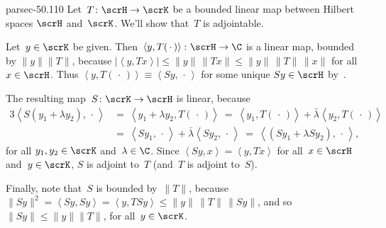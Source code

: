 \documentclass[b5page]{book}
\begin{document}
\begin{solution}{parsec-50.110}%
Let~$T\colon \scrH\to\scrK$
be a bounded linear map between Hilbert spaces
$\scrH$ and~$\scrK$.
We'll show that~$T$ is adjointable.

Let~$y \in \scrK$ be given. 
    Then~$\left<y,T(\,\cdot\,)\right>\colon \scrH\to\C$
    is a linear map,
    bounded by $\|y\|\|T\|$,
    because $\left|\left<y,Tx\right>\right|\leq
    \|y\|\, \|Tx\|\leq \|y\|\,\|T\|\,\|x\|$
    for all~$x\in \scrH$.
Thus $\left<y,T(\,\cdot\,)\right>\equiv \left<Sy,\,\cdot\,\right>$
    for some unique $Sy\in \scrH$ by~.

The resulting map~$S\colon \scrK\to\scrH$
is linear, because
    \begin{alignat*}{3}
\left<S(y_1+\lambda y_2),\,\cdot\,\right>
        &=\  \left< y_1+\lambda y_2, T(\,\cdot\,)\right>
    \ =\  \left<y_1,T(\,\cdot\,)\right> + 
    \bar\lambda\left<y_2,T(\,\cdot\,)\right>\\
        \ &=\  \left<Sy_1,\,\cdot\,\right> + 
    \bar\lambda\left<Sy_2,\,\cdot\,\right>
    \ =\  \left<(Sy_1+\lambda Sy_2),\,\cdot\,\right>,
\end{alignat*}
for all $y_1,y_2\in\scrK$ and~$\lambda\in\C$.
Since $\left<Sy,x\right>=\left<y,Tx\right>$
for all~$x\in\scrH$ and~$y\in\scrK$,
 $S$ is adjoint to~$T$ (and~$T$ is adjoint to~$S$).

Finally, note that~$S$ is bounded by~$\|T\|$,
because
$\|Sy\|^2 = \left<Sy,Sy\right>
= \left<y,TSy\right>
\leq \|y\|\,\|T\|\,\|Sy\|$,
and so~$\|Sy\|\leq \|y\|\|T\|$,
for all~$y\in\scrK$.
\end{solution}
\end{document}
